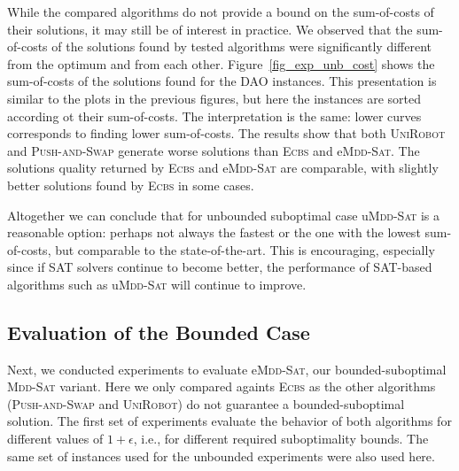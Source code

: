 \documentclass[letterpaper]{article}
\begin{document}
While the compared algorithms do not provide a bound on the sum-of-costs of their solutions, 
it may still be of interest in practice. We observed that the sum-of-costs 
of the solutions found by tested algorithms were significantly different from the optimum and from each other. Figure~\ref{fig_exp_unb_cost} shows 
	the sum-of-costs of the solutions found for the DAO instances.
	This presentation is similar to the plots in the previous figures, 
	but here the instances are sorted according ot their sum-of-costs. 
	The interpretation is the same: lower curves corresponds to finding lower sum-of-costs. 
	The results show that both \textsc{UniRobot} and \textsc{Push-and-Swap} generate
worse solutions than \textsc{Ecbs} and  e\textsc{Mdd-Sat}. The solutions quality returned by \textsc{Ecbs} and  e\textsc{Mdd-Sat} are comparable, with slightly better solutions found by \textsc{Ecbs} in some cases. 


Altogether we can conclude that for unbounded suboptimal case 
 u\textsc{Mdd-Sat} is a reasonable option: perhaps not always the fastest or the one with the lowest sum-of-costs, but comparable to the state-of-the-art. This is encouraging, especially since 
 if SAT solvers continue to become better, the performance of SAT-based algorithms such as 
  u\textsc{Mdd-Sat} will continue to improve. 




\subsection{Evaluation of the Bounded Case}

Next, we conducted experiments to evaluate e\textsc{Mdd-Sat}, our bounded-suboptimal  \textsc{Mdd-Sat} variant. Here we only compared againts \textsc{Ecbs} as the other algorithms (\textsc{Push-and-Swap} and \textsc{UniRobot}) do not guarantee a bounded-suboptimal solution. 
The first set of experiments evaluate the behavior of both algorithms for different values of $1+\epsilon$, i.e., for different required suboptimality bounds. 
The same set of instances used for the unbounded experiments were also used here. %
\end{document}

